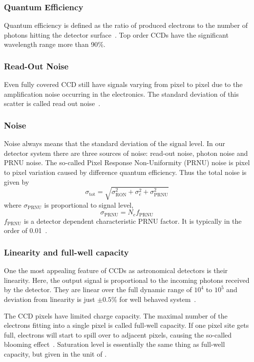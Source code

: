 \subsubsection{Quantum Efficiency}
Quantum efficiency is defined as the ratio of produced electrons to the number of photons hitting the detector surface~\cite{manual}. Top order CCDs have the significant wavelength range more than 90$\% $.

\subsubsection{Read-Out Noise}
Even fully covered CCD still have signals varying from pixel to pixel due to the amplification noise occurring in the electronics. The standard deviation of this scatter is called read out noise~\cite{manual}. 

\subsubsection{Noise}
Noise always means that the standard deviation of the signal level. In our detector system there are three sources of noise: read-out noise, photon noise and PRNU noise. The so-called Pixel Response Non-Uniformity (PRNU) noise is pixel to pixel variation caused by difference quantum efficiency. Thus the total noise is given by~\cite{manual}
\begin{equation}
	\sigma_{\text{tot}}=\sqrt{ \sigma^2_{\text{RON}} + \sigma^2_{e} + \sigma^2_\text{PRNU}}
\end{equation}
where $ \sigma_{\text{PRNU}} $ is proportional to signal level,
\begin{equation}
\sigma_{\text{PRNU}}={N}_{e} {f}_{\text{PRNU}}
\label{math:fPRNU}
\end{equation} 
$ {f}_{\text{PRNU}} $ is a detector dependent characteristic PRNU factor. It is typically in the order of 0.01~\cite{manual}.

\subsubsection{Linearity and full-well capacity}
One the most appealing feature of CCDs as astronomical detectors is their linearity. Here, the output signal is proportional to the incoming photons received by the detector. They are linear over the full dynamic range of $10^4 $ to $10^5 $ and deviation from linearity is just $\pm 0.5 \%$  for well behaved system~\cite{manual}.

The CCD pixels have limited charge capacity. The maximal number of the electrons fitting into a single pixel is called full-well capacity. If one pixel site gets full, electrons will start to spill over to adjacent pixels, causing the so-called  blooming effect~\cite{manual}. Saturation level is essentially the same thing as full-well capacity, but given in the unit of \si{\ADU}.  
